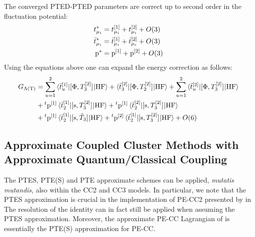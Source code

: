 The converged \acrshort{PTED}-\acrshort{PTED} parameters are correct up
to second order in the fluctuation potential:
\begin{subequations}
  \begin{align}
    t_{\mu_i}^{*} &= t_{\mu_i}^{[1]} + t_{\mu_i}^{[2]} + O(3)
    \label{eq:tamp-star} \\
    \bar{t}_{\mu_i}^{*} &= \bar{t}_{\mu_i}^{[1]} + \bar{t}_{\mu_i}^{[2]} + O(3)
    \label{eq:tbar-star} \\
    \mathrm{p}^{*} &= \mathrm{p}^{[1]} + \mathrm{p}^{[2]} + O(3)
    \label{eq:p-star}
  \end{align}
\end{subequations}
Using the equations above one can expand the energy correction as
follows:
\begin{equation}
  \begin{aligned}
  G_{\Lambda(\text{T})} &=
  \sum_{u=1}^2 \braket{\bar{t}_{u}^{[1]} | [ \Phi, T_3^{[2]} ]^{} | \mathrm{HF}}
  +
  \braket{\bar{t}_{3}^{[2]} | [ \Phi, T_2^{[2]} ]^{} | \mathrm{HF}}
  +
  \sum_{u=1}^2 \braket{\bar{t}_{u}^{[2]} | [ \Phi, T_3^{[2]} ]^{} | \mathrm{HF}}
  \\
  &+
  {}^t\mathrm{p}^{[1]} \braket{\bar{t}_{2}^{[1]} | [ \mathrm{s}, T_3^{[2]} ]^{} | \mathrm{HF}}
  +
  {}^t\mathrm{p}^{[1]} \braket{\bar{t}_{2}^{[2]} | [ \mathrm{s}, T_3^{[2]} ]^{} | \mathrm{HF}}
   \\
  &+
  {}^t\mathrm{p}^{[1]} \braket{\bar{t}_{2}^{[1]} | [ \mathrm{s}, \tilde{T}_3 ]^{} | \mathrm{HF}}
  +
  {}^t\mathrm{p}^{[2]} \braket{\bar{t}_{2}^{[1]} | [ \mathrm{s}, T_3^{[2]} ]^{} | \mathrm{HF}}
  + O(6)
  \end{aligned}
\end{equation}

\subsection{Approximate Coupled Cluster Methods with Approximate
Quantum/Classical Coupling}\label{sec:approximate-everything}

The \acrshort{PTES}, \acrshort{PTE(S)} and \acrshort{PTE} approximate
schemes can be applied, \emph{mutatis mutandis}, also within the
\acrshort{CC2} and \acrshort{CC3} models.\autocite{Caricato2011-tx, Schwabe2012-cf, Krause2016-ee}
In particular, we note that the \acrshort{PTES} approximation is crucial
in the implementation of \acrshort{PE}-\acrshort{CC2} presented by
\citeauthor{Schwabe2012-cf} in 
The resolution of the identity can in fact still be applied when
assuming the \acrshort{PTES} approximation.
Moreover, the approximate \acrshort{PE}-\acrshort{CC} Lagrangian of
\citeauthor{Krause2016-ee} is essentially the \acrshort{PTE(S)}
approximation for \acrshort{PE}-\acrshort{CC}.\autocite{Krause2016-ee}
